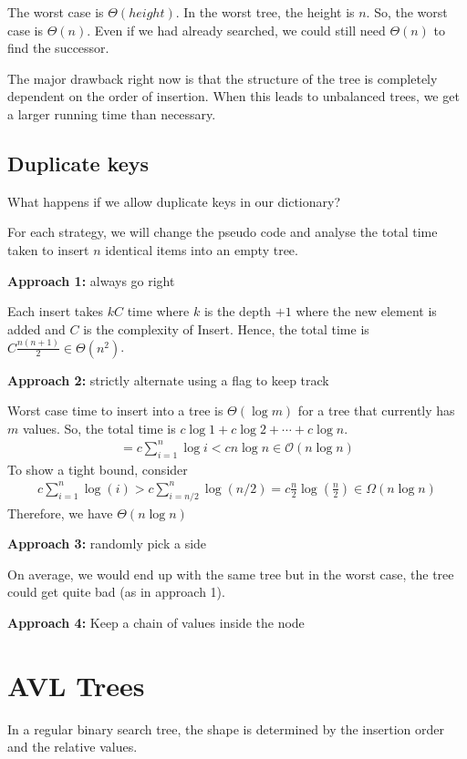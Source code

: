 \documentclass[11pt]{article}
\begin{document}
The worst case is $\Theta(height)$. In the worst tree, the height is $n$. So, the worst case is $\Theta(n)$. Even if we had already searched, we could still need $\Theta(n)$ to find the successor. 

The major drawback right now is that the structure of the tree is completely dependent on the order of insertion. When this leads to unbalanced trees, we get a larger running time than necessary. \bigskip 

\subsection{Duplicate keys}

What happens if we allow duplicate keys in our dictionary?

For each strategy, we will change the pseudo code and analyse the total time taken to insert $n$ identical items into an empty tree. 

\textbf{Approach 1:} always go right

Each insert takes $kC$ time where $k$ is the depth $+1$ where the new element is added and $C$ is the complexity of Insert. Hence, the total time is $C \frac{n(n+1)}{2} \in \Theta(n^2)$.

\textbf{Approach 2:} strictly alternate using a flag to keep track 

Worst case time to insert into a tree is $\Theta(\log m)$ for a tree that currently has $m$ values. So, the total time is $ c\log 1 + c\log 2 + \cdots + c \log n$. 
\begin{align*}
    = c \sum_{i=1}^n \log i < cn\log n \in \mathcal{O}(n \log n)
\end{align*}
To show a tight bound, consider 
\begin{align*}
    c \sum_{i=1}^n \log(i) > c \sum_{i = n/2}^n \log(n/2) = c\frac{n}{2}\log(\frac{n}{2}) \in \Omega(n\log n)
\end{align*}
Therefore, we have $\Theta(n \log n)$

\textbf{Approach 3:} randomly pick a side 

On average, we would end up with the same tree but in the worst case, the tree could get quite bad (as in approach 1).

\textbf{Approach 4:} Keep a chain of values inside the node

\newpage 
\section{AVL Trees}
In a regular binary search tree, the shape is determined by the insertion order and the relative values. 
\end{document}
